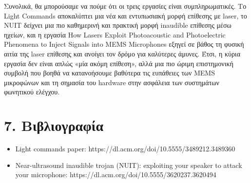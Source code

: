 \documentclass[12pt,a4paper]{report}
\begin{document}
	Συνολικά, θα μπορούσαμε να πούμε ότι οι τρεις εργασίες είναι συμπληρωματικές. Το Light Commands αποκαλύπτει μια νέα και εντυπωσιακή μορφή επίθεσης με laser, το NUIT δείχνει μια πιο καθημερινή και πρακτική μορφή inaudible επίθεσης μέσω ηχείων, και η εργασία How Lasers Exploit Photoacoustic and Photoelectric Phenomena to Inject Signals into MEMS Microphones εξηγεί σε βάθος τη φυσική αιτία της laser επίθεσης και ανοίγει τον δρόμο για καλύτερες άμυνες. Έτσι, η κύρια εργασία δεν είναι απλώς «μία ακόμη επίθεση», αλλά μια πιο ώριμη επιστημονική συμβολή που βοηθά να κατανοήσουμε βαθύτερα τις ευπάθειες των MEMS μικροφώνων και τη σημασία του hardware στην ασφάλεια των συστημάτων φωνητικού ελέγχου.
	
	\vspace{1cm}
	

	\chapter*{7. Βιβλιογραφία}
	
	\vspace{0.5cm}
	
	\begin{itemize}
		\item 
		Light commands paper:
		https://dl.acm.org/doi/10.5555/3489212.3489360

		
	\end{itemize}
	\begin{itemize}
		\item 
		Near-ultrasound inaudible trojan (NUIT): exploiting your speaker to attack your microphone:
	https://dl.acm.org/doi/10.5555/3620237.3620494
		\end{itemize}
\end{document}
